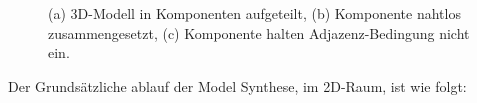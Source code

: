 \documentclass[12pt, a4paper,twoside,openright]{report}
\begin{document}
\begin{figure}[H]
    \centering
    \qquad
    \qquad
    \caption{(a) 3D-Modell in Komponenten aufgeteilt, (b) Komponente nahtlos zusammengesetzt, (c) Komponente halten Adjazenz-Bedingung nicht ein. \cite{merrell2009model}}%
\end{figure}

Der Grundsätzliche ablauf der Model Synthese, im 2D-Raum, ist wie folgt:
\end{document}
